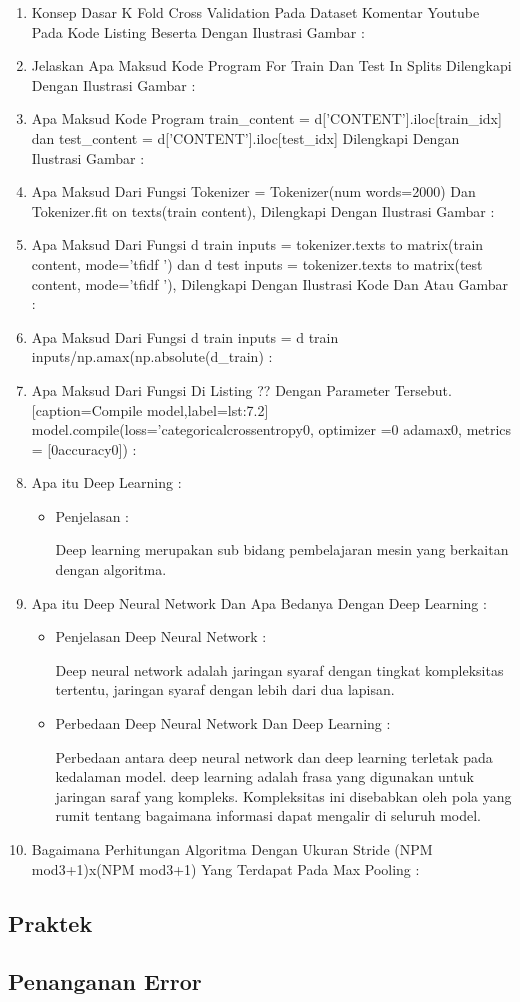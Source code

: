 \begin{enumerate}
\item Konsep Dasar K Fold Cross Validation Pada Dataset Komentar Youtube Pada Kode Listing Beserta Dengan Ilustrasi Gambar :
\item Jelaskan Apa Maksud Kode Program For Train Dan Test In Splits Dilengkapi Dengan Ilustrasi Gambar :
\item Apa Maksud Kode Program train\_content = d['CONTENT'].iloc[train\_idx] dan test\_content = d['CONTENT'].iloc[test\_idx] Dilengkapi Dengan Ilustrasi Gambar :
\item Apa Maksud Dari Fungsi Tokenizer = Tokenizer(num words=2000) Dan Tokenizer.fit on texts(train content), Dilengkapi Dengan Ilustrasi Gambar :
\item Apa Maksud Dari Fungsi d train inputs = tokenizer.texts to matrix(train content, mode=’tfidf ’) dan d test inputs = tokenizer.texts to matrix(test content, mode=’tfidf ’), Dilengkapi Dengan Ilustrasi Kode Dan Atau Gambar :
\item Apa Maksud Dari Fungsi d train inputs = d train inputs/np.amax(np.absolute(d\_train) :
\item Apa Maksud Dari Fungsi Di Listing ?? Dengan Parameter Tersebut. [caption=Compile model,label=lst:7.2] model.compile(loss=’categoricalcrossentropy0, optimizer =0 adamax0, metrics = [0accuracy0]) :
\item Apa itu Deep Learning :
\begin{itemize}
\item Penjelasan :
\par Deep learning merupakan sub bidang pembelajaran mesin yang berkaitan dengan algoritma.
\par
\end{itemize}
\item Apa itu Deep Neural Network Dan Apa Bedanya Dengan Deep Learning :
\begin{itemize}
\item Penjelasan Deep Neural Network : 
\par Deep neural network adalah jaringan syaraf dengan tingkat kompleksitas tertentu, jaringan syaraf dengan lebih dari dua lapisan.
\par
\item Perbedaan Deep Neural Network Dan Deep Learning :
\par Perbedaan antara deep neural network dan deep learning terletak pada kedalaman model. deep learning adalah frasa yang digunakan untuk jaringan saraf yang kompleks. Kompleksitas ini disebabkan oleh pola yang rumit tentang bagaimana informasi dapat mengalir di seluruh model.
\par
\par
\end{itemize}
\item Bagaimana Perhitungan Algoritma Dengan Ukuran Stride (NPM mod3+1)x(NPM mod3+1) Yang  Terdapat Pada Max Pooling :
\end{enumerate}


\subsection{Praktek}


\subsection{Penanganan Error}
